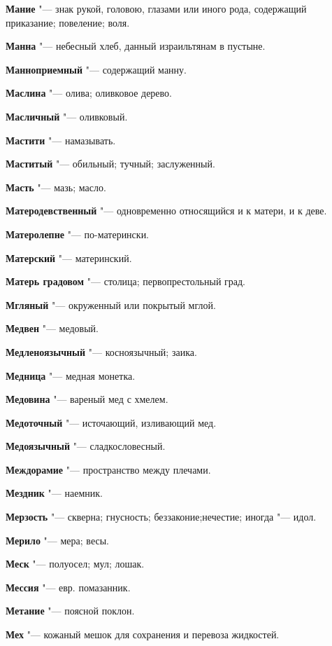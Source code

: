 \begin{mymulticols}
\noindent\textbf{Мание} "--- знак рукой, головою, глазами или иного рода, содержащий приказание; повеление; воля. 

\noindent\textbf{Манна} "--- небесный хлеб, данный израильтянам в пустыне. 

\noindent\textbf{Манноприемный} "--- содержащий манну. 

\noindent\textbf{Маслина} "--- олива; оливковое дерево. 

\noindent\textbf{Масличный} "--- оливковый. 

\noindent\textbf{Мастити} "--- намазывать. 

\noindent\textbf{Маститый} "--- обильный; тучный; заслуженный. 

\noindent\textbf{Масть} "--- мазь; масло. 

\noindent\textbf{Матеродевственный} "--- одновременно относящийся и к матери, и к деве. 

\noindent\textbf{Матеролепне} "--- по-матерински. 

\noindent\textbf{Матерский} "--- материнский. 

\noindent\textbf{Матерь градовом} "--- столица; первопрестольный град. 

\noindent\textbf{Мгляный} "--- окруженный или покрытый мглой. 

\noindent\textbf{Медвен} "--- медовый. 

\noindent\textbf{Медленоязычный} "--- косноязычный; заика. 

\noindent\textbf{Медница} "--- медная монетка. 

\noindent\textbf{Медовина} "--- вареный мед с хмелем. 

\noindent\textbf{Медоточный} "--- источающий, изливающий мед. 

\noindent\textbf{Медоязычный} "--- сладкословесный. 

\noindent\textbf{Междорамие} "--- пространство между плечами. 

\noindent\textbf{Мездник} "--- наемник. 

\noindent\textbf{Мерзость} "--- скверна; гнусность; беззаконие;нечестие; иногда "--- идол. 

\noindent\textbf{Мерило} "--- мера; весы. 

\noindent\textbf{Меск} "--- полуосел; мул; лошак. 

\noindent\textbf{Мессия} "--- евр. помазанник. 

\noindent\textbf{Метание} "--- поясной поклон. 

\noindent\textbf{Мех} "--- кожаный мешок для сохранения и перевоза жидкостей. 


\end{mymulticols}
